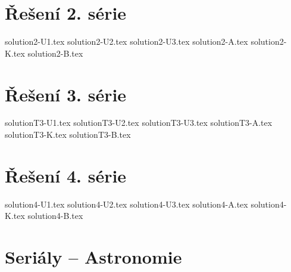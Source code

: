 \documentclass{../../style/mkibrochure}
\begin{document}

\section*{\centering Řešení 2. série}
{solution2-U1.tex}
{solution2-U2.tex}
\newpage
{solution2-U3.tex}
{solution2-A.tex}
{solution2-K.tex}
{solution2-B.tex}
\newpage



\section*{\centering Řešení 3. série}
{solutionT3-U1.tex}
{solutionT3-U2.tex}
{solutionT3-U3.tex}
{solutionT3-A.tex}
{solutionT3-K.tex}
{solutionT3-B.tex}
\newpage



\section*{\centering Řešení 4. série}
{solution4-U1.tex}
{solution4-U2.tex}
\newpage
{solution4-U3.tex}
{solution4-A.tex}
{solution4-K.tex}
{solution4-B.tex}
\newpage


\section*{\centering Seriály -- Astronomie}
\newpage
\end{document}
